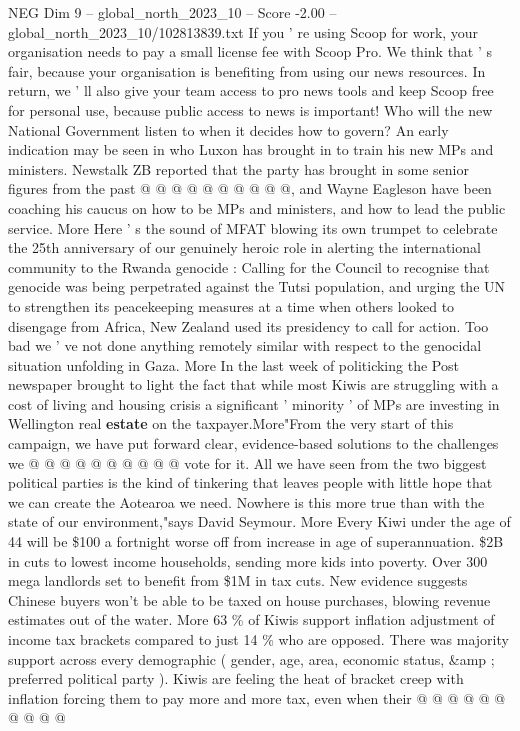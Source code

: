 \begin{textsample}{NEG Dim 9 – global\_north\_2023\_10 – Score -2.00 – global\_north\_2023\_10/102813839.txt}
If you ' re using Scoop for work, your organisation needs to pay a small license fee with Scoop Pro.
We think that ' s fair, because your organisation is benefiting from using our news resources.
In return, we ' ll also give your team access to pro news tools and keep Scoop free for personal use, because public access to news is important!
Who will the new National Government listen to when it decides how to govern?
An early indication may be seen in who Luxon has brought in to train his new MPs and ministers.
Newstalk ZB reported that the party has brought in some senior figures from the past @ @ @ @ @ @ @ @ @ @, and Wayne Eagleson have been coaching his caucus on how to be MPs and ministers, and how to lead the public service.
More Here ' s the sound of MFAT blowing its own trumpet to celebrate the 25th anniversary of our genuinely heroic role in alerting the international community to the Rwanda genocide : Calling for the Council to recognise that genocide was being perpetrated against the Tutsi population, and urging the UN to strengthen its peacekeeping measures at a time when others looked to disengage from Africa, New Zealand used its presidency to call for action.
Too bad we ' ve not done anything remotely similar with respect to the genocidal situation unfolding in Gaza.
More In the last week of politicking the Post newspaper brought to light the fact that while most Kiwis are struggling with a cost of living and housing crisis a significant ' minority ' of MPs are investing in Wellington real \textbf{estate} on the taxpayer.More"From the very start of this campaign, we have put forward clear, evidence-based solutions to the challenges we @ @ @ @ @ @ @ @ @ @ vote for it.
All we have seen from the two biggest political parties is the kind of tinkering that leaves people with little hope that we can create the Aotearoa we need.
Nowhere is this more true than with the state of our environment,"says David Seymour.
More Every Kiwi under the age of 44 will be \$100 a fortnight worse off from increase in age of superannuation. \$2B in cuts to lowest income households, sending more kids into poverty.
Over 300 mega landlords set to benefit from \$1M in tax cuts.
New evidence suggests Chinese buyers won't be able to be taxed on house purchases, blowing revenue estimates out of the water.
More 63 \% of Kiwis support inflation adjustment of income tax brackets compared to just 14 \% who are opposed.
There was majority support across every demographic ( gender, age, area, economic status, \&amp ; preferred political party ).
Kiwis are feeling the heat of bracket creep with inflation forcing them to pay more and more tax, even when their @ @ @ @ @ @ @ @ @ @

\end{textsample}
